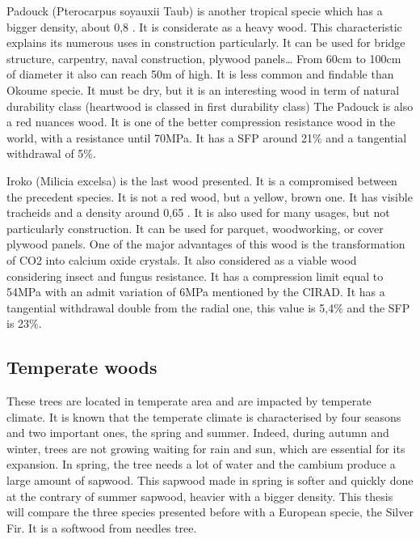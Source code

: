 Padouck (Pterocarpus soyauxii Taub) is another tropical specie which has a bigger density, about 0,8 \parencite{Reference7}. It is considerate as a heavy wood. This characteristic explains its numerous uses in construction particularly. It can be used for bridge structure, carpentry, naval construction, plywood panels…   From 60cm to 100cm of diameter it also can reach 50m of high. It is less common and findable than Okoume specie. It must be dry, but it is an interesting wood in term of natural durability class (heartwood is classed in first durability class)
The Padouck is also a red nuances wood. It is one of the better compression resistance wood in the world, with a resistance until 70MPa. It has a SFP around 21\% and a tangential withdrawal of 5\%.

Iroko (Milicia excelsa) is the last wood presented. It is a compromised between the precedent species. It is not a red wood, but a yellow, brown one. It has visible tracheids and a density around 0,65 \parencite{Reference7} . It is also used for many usages, but not particularly construction. It can be used for parquet, woodworking, or cover plywood panels. One of the major advantages of this wood is the transformation of CO2 into calcium oxide crystals. It also considered as a viable wood considering insect and fungus resistance. It has a compression limit equal to 54MPa with an admit variation of 6MPa mentioned by the CIRAD. It has a tangential withdrawal double from the radial one, this value is 5,4\% and the SFP is 23\%.



\subsection{Temperate woods}

These trees are located in temperate area and are impacted by temperate climate. It is known that the temperate climate is characterised by four seasons and two important ones, the spring and summer. Indeed, during autumn and winter, trees are not growing waiting for rain and sun, which are essential for its expansion. In spring, the tree needs a lot of water and the cambium produce a large amount of sapwood. This sapwood made in spring is softer and quickly done at the contrary of summer sapwood, heavier with a bigger density. This thesis will compare the three species presented before with a European specie, the Silver Fir. It is a softwood from needles tree. 

